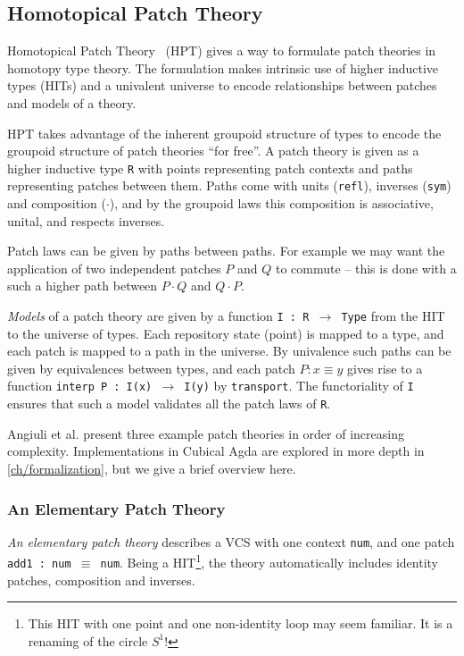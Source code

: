 \subsection{Homotopical Patch Theory}\label{subsec:hpt}

Homotopical Patch Theory~\cite{Angiuli2016} (HPT) gives a way to formulate patch
theories in homotopy type theory. The formulation makes intrinsic use of higher
inductive types (HITs) and a univalent universe to encode relationships between
patches and models of a theory.

HPT takes advantage of the inherent groupoid structure of types to encode the
groupoid structure of patch theories ``for free''. A patch theory is given as a
higher inductive type \texttt{R} with points representing patch contexts and
paths representing patches between them. Paths come with units (\texttt{refl}),
inverses (\texttt{sym}) and composition (\texttt{$\cdot$}),
and by the groupoid laws this composition is associative, unital, and respects
inverses.

Patch laws can be given by paths between paths. For example we may
want the application of two independent patches $P$ and $Q$ to commute -- this is done with
a such a higher path between $P \cdot Q$ and $Q \cdot P$.

\emph{Models} of a patch theory are given by a function \texttt{I : R
  $\rightarrow$ Type} from the HIT to the universe of types. Each repository
state (point) is mapped to a type, and each patch is mapped to a path in the
universe. By univalence such paths can be given by equivalences between types,
and each patch $P : x \equiv y$ gives rise to a function \texttt{interp P : I(x)
$\rightarrow$ I(y)} by \texttt{transport}. The functoriality of \texttt{I}
ensures that such a model validates all the patch laws of \texttt{R}.

Angiuli et al. present three example patch theories in order of increasing
complexity. Implementations in Cubical Agda are explored in more depth in
\autoref{ch/formalization}, but we give a brief overview here.

\subsubsection{An Elementary Patch Theory}

\emph{An elementary patch theory} describes a VCS with one context \texttt{num}, and
one patch \texttt{add1~:~num~$\equiv$~num}. Being a HIT\footnote{This HIT with one point and
one non-identity loop may seem familiar. It is a renaming of the circle $S^1$!},
the theory automatically includes identity patches, composition and inverses.

